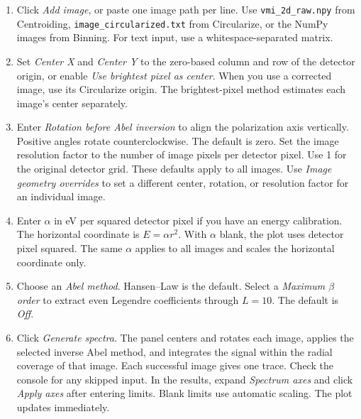 \documentclass[11pt,a4paper]{article}
\newcommand{\code}[1]{\texttt{#1}}
\begin{document}
\begin{enumerate}
  \item Click \emph{Add image}, or paste one image path per line. Use
        \code{vmi\_2d\_raw.npy} from Centroiding,
        \code{image\_circularized.txt} from Circularize, or the NumPy images
        from Binning. For text input, use a whitespace-separated matrix.
  \item Set \emph{Center X} and \emph{Center Y} to the zero-based column and
        row of the detector origin, or enable \emph{Use brightest pixel as
        center}. When you use a corrected image, use its Circularize
        origin. The brightest-pixel method estimates each image's center
        separately.
  \item Enter \emph{Rotation before Abel inversion} to align the polarization
        axis vertically. Positive angles rotate counterclockwise. The default
        is zero. Set the image resolution factor to the number of image
        pixels per detector pixel. Use 1 for the original detector grid.
        These defaults apply to all images. Use \emph{Image geometry
        overrides} to set a different center, rotation, or resolution
        factor for an individual image.
  \item Enter $\alpha$ in eV per squared detector pixel if you have an
        energy calibration. The horizontal coordinate is $E=\alpha r^2$.
        With $\alpha$ blank, the plot uses detector pixel squared.
        The same $\alpha$ applies to all images and scales the horizontal
        coordinate only.
  \item Choose an \emph{Abel method}. Hansen--Law is the default.
        Select a \emph{Maximum $\beta$ order} to extract even Legendre
        coefficients through $L=10$. The default is \emph{Off}.
  \item Click \emph{Generate spectra}. The panel centers and rotates each
        image, applies the selected inverse Abel method, and integrates the
        signal within the radial coverage of that image. Each successful
        image gives one trace. Check the console for
        any skipped input. In the results, expand \emph{Spectrum axes} and
        click \emph{Apply axes} after entering limits. Blank limits use
        automatic scaling. The plot updates immediately.
\end{enumerate}
\end{document}
